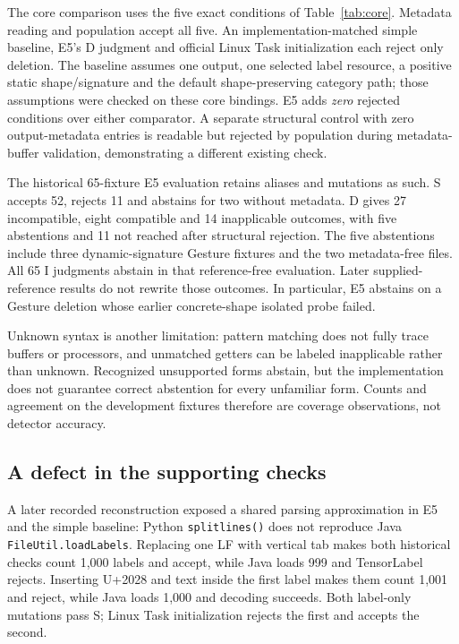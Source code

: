\documentclass[10pt,twocolumn,letterpaper]{article}
\newcommand{\code}[1]{\texttt{#1}}
\begin{document}
The core comparison uses the five exact conditions of Table~\ref{tab:core}. Metadata reading and population accept all five. An implementation-matched simple baseline, E5's D judgment and official Linux Task initialization each reject only deletion. The baseline assumes one output, one selected label resource, a positive static shape/signature and the default shape-preserving category path; those assumptions were checked on these core bindings. E5 adds \emph{zero} rejected conditions over either comparator. A separate structural control with zero output-metadata entries is readable but rejected by population during metadata-buffer validation, demonstrating a different existing check.

The historical 65-fixture E5 evaluation retains aliases and mutations as such. S accepts 52, rejects 11 and abstains for two without metadata. D gives 27 incompatible, eight compatible and 14 inapplicable outcomes, with five abstentions and 11 not reached after structural rejection. The five abstentions include three dynamic-signature Gesture fixtures and the two metadata-free files. All 65 I judgments abstain in that reference-free evaluation. Later supplied-reference results do not rewrite those outcomes. In particular, E5 abstains on a Gesture deletion whose earlier concrete-shape isolated probe failed.

Unknown syntax is another limitation: pattern matching does not fully trace buffers or processors, and unmatched getters can be labeled inapplicable rather than unknown. Recognized unsupported forms abstain, but the implementation does not guarantee correct abstention for every unfamiliar form. Counts and agreement on the development fixtures therefore are coverage observations, not detector accuracy.

\subsection{A defect in the supporting checks}
A later recorded reconstruction exposed a shared parsing approximation in E5 and the simple baseline: Python \code{splitlines()} does not reproduce Java \code{FileUtil.loadLabels}. Replacing one LF with vertical tab makes both historical checks count 1,000 labels and accept, while Java loads 999 and TensorLabel rejects. Inserting U+2028 and text inside the first label makes them count 1,001 and reject, while Java loads 1,000 and decoding succeeds. Both label-only mutations pass S; Linux Task initialization rejects the first and accepts the second.
\end{document}
